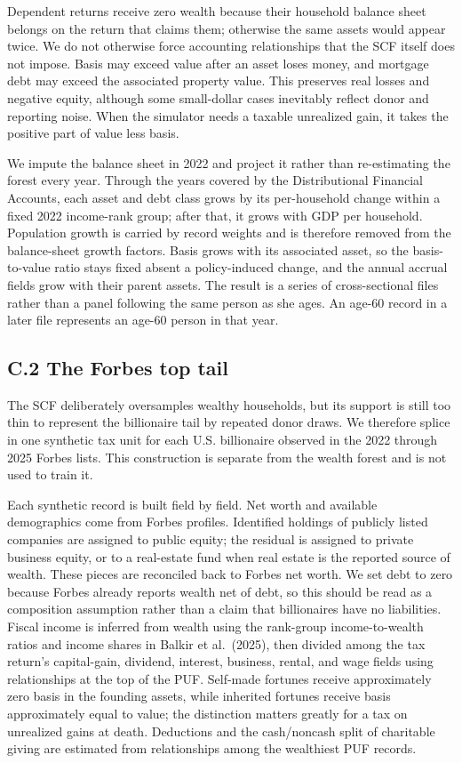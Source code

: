 \documentclass[10pt,twocolumn]{article}
\begin{document}
Dependent returns receive zero wealth because their household balance
sheet belongs on the return that claims them; otherwise the same assets
would appear twice. We do not otherwise force accounting relationships
that the SCF itself does not impose. Basis may exceed value after an
asset loses money, and mortgage debt may exceed the associated property
value. This preserves real losses and negative equity, although some
small-dollar cases inevitably reflect donor and reporting noise. When
the simulator needs a taxable unrealized gain, it takes the positive
part of value less basis.

We impute the balance sheet in 2022 and project it rather than
re-estimating the forest every year. Through the years covered by the
Distributional Financial Accounts, each asset and debt class grows by
its per-household change within a fixed 2022 income-rank group; after
that, it grows with GDP per household. Population growth is carried by
record weights and is therefore removed from the balance-sheet growth
factors. Basis grows with its associated asset, so the basis-to-value
ratio stays fixed absent a policy-induced change, and the annual accrual
fields grow with their parent assets. The result is a series of cross-sectional files rather than a panel following
the same person as she ages. An age-60 record in a later file represents an
age-60 person in that year.

\subsection*{C.2 The Forbes top tail}

The SCF deliberately oversamples wealthy households, but its support is
still too thin to represent the billionaire tail by repeated donor
draws. We therefore splice in one synthetic tax unit for each U.S.
billionaire observed in the 2022 through 2025 Forbes lists. This construction is separate from the wealth forest and is not used to train
it.

Each synthetic record is built field by field. Net worth and available
demographics come from Forbes profiles. Identified holdings of publicly
listed companies are assigned to public equity; the residual is assigned
to private business equity, or to a real-estate fund when real estate is
the reported source of wealth. These pieces are reconciled back to
Forbes net worth. We set debt to zero because Forbes already reports
wealth net of debt, so this should be read as a composition assumption
rather than a claim that billionaires have no liabilities. Fiscal income
is inferred from wealth using the rank-group income-to-wealth ratios and
income shares in Balkir et al.~(2025), then divided among the tax
return's capital-gain, dividend, interest, business, rental, and wage
fields using relationships at the top of the PUF. Self-made fortunes
receive approximately zero basis in the founding assets, while inherited
fortunes receive basis approximately equal to value; the distinction matters greatly for a tax on unrealized gains at death. Deductions and the
cash/noncash split of charitable giving are estimated from relationships
among the wealthiest PUF records.
\end{document}
